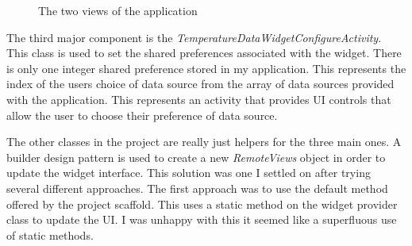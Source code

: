 \documentclass[paper=a4, fontsize=11pt]{scrartcl}	%
\numberwithin{equation}{section}															%
\numberwithin{figure}{section}																%
\numberwithin{table}{section}
\begin{document}
\begin{figure}[ht]
\centering
{}
\caption{The two views of the application}
\label{fig:application-views}
\end{figure}

The third major component is the \textit{TemperatureDataWidgetConfigureActivity}. This class is used to set the shared preferences associated with the widget. There is only one integer shared preference stored in my application. This represents the index of the users choice of data source from the array of data sources provided with the application. This represents an activity that provides UI controls that allow the user to choose their preference of data source.

The other classes in the project are really just helpers for the three main ones. A builder design pattern is used to create a new \textit{RemoteViews} object in order to update the widget interface. This solution was one I settled on after trying several different approaches. The first approach was to use the default method offered by the project scaffold. This uses a static method on the widget provider class to update the UI. I was unhappy with this it seemed like a superfluous use of static methods.
\end{document}
